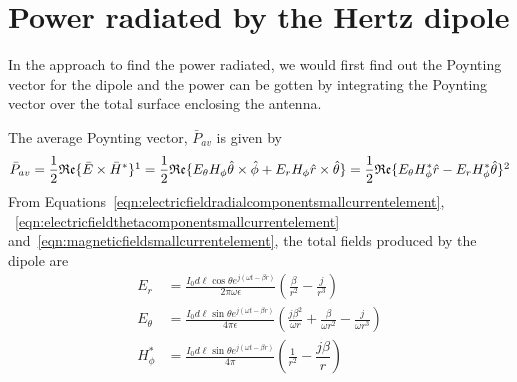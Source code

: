 \chapter{Power radiated by the Hertz dipole}\label{lec:lec49}
In the approach to find the power radiated, we would first find out the Poynting vector for the dipole and the power can be gotten by integrating the Poynting vector 
over the total surface enclosing the antenna.

The average Poynting vector, $\bar{P}_{av}$ is given by
\begin{dmath*}
\bar{P}_{av} = \dfrac{1}{2}\mathfrak{Re}\{\bar{E} \times \bar{H}^\ast\}\footnotemark
= \frac{1}{2}\mathfrak{Re}\{E_\theta H_\phi\hat{\theta} \times \hat{\phi} + E_r H_\phi\hat{r}\times \hat{\theta}\}
= \frac{1}{2}\mathfrak{Re}\{E_\theta H_\phi^\ast\hat{r} - E_r H_\phi^\ast\hat{\theta}\}\footnotemark
\end{dmath*}
From Equations~\eqref{eqn:electricfieldradialcomponentsmallcurrentelement}, ~\eqref{eqn:electricfieldthetacomponentsmallcurrentelement} and~\eqref{eqn:magneticfieldsmallcurrentelement}, the total fields produced by the dipole are
\begin{align*}
E_r &= \frac{I_0 d\ell\cos\theta e^{j(\omega t - \beta r)}}{2\pi\omega\epsilon}\left(\frac{\beta}{r^2} - \frac{j}{r^3}\right)\\  
E_\theta &= \frac{I_0 d\ell\sin\theta e^{j(\omega t - \beta r)}}{4\pi\epsilon}\left(\frac{j\beta^2}{\omega r} + \frac{\beta}{\omega r^2} - \frac{j}{\omega r^3}\right)\\    
H_\phi^\ast &= \frac{I_0 d\ell\sin\theta e^{j(\omega t - \beta r)}}{4\pi}\left(\frac{1}{r^2} - \dfrac{j\beta}{r}\right)
\end{align*}

